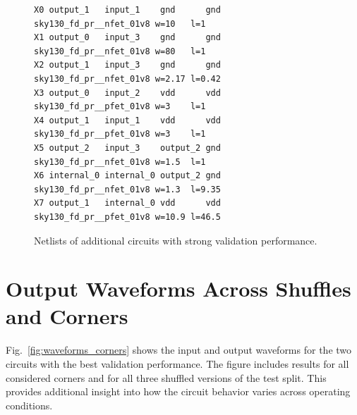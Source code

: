 \documentclass[sigconf,pbalance]{acmart_modified}
\newcommand{\squeezeSection}{}
\begin{document}
\begin{figure}[H]
\begin{prompt}
\footnotesize
\begin{Verbatim}
X0 output_1   input_1    gnd      gnd sky130_fd_pr__nfet_01v8 w=10   l=1
X1 output_0   input_3    gnd      gnd sky130_fd_pr__nfet_01v8 w=80   l=1
X2 output_1   input_3    gnd      gnd sky130_fd_pr__nfet_01v8 w=2.17 l=0.42
X3 output_0   input_2    vdd      vdd sky130_fd_pr__pfet_01v8 w=3    l=1
X4 output_1   input_1    vdd      vdd sky130_fd_pr__pfet_01v8 w=3    l=1
X5 output_2   input_3    output_2 gnd sky130_fd_pr__nfet_01v8 w=1.5  l=1
X6 internal_0 internal_0 output_2 gnd sky130_fd_pr__nfet_01v8 w=1.3  l=9.35
X7 output_1   internal_0 vdd      vdd sky130_fd_pr__pfet_01v8 w=10.9 l=46.5
\end{Verbatim}
\end{prompt}
\caption{Netlists of additional circuits with strong validation performance.}
\label{fig:other_good_circuits}
\end{figure}

\clearpage

\squeezeSection\section{Output Waveforms Across Shuffles and Corners}
\label{appx:output_waveforms}
Fig.~\ref{fig:waveforms_corners} shows the input and output waveforms for the two circuits with the best validation performance. The figure includes results for all considered corners and for all three shuffled versions of the test split. This provides additional insight into how the circuit behavior varies across operating conditions.
\end{document}
